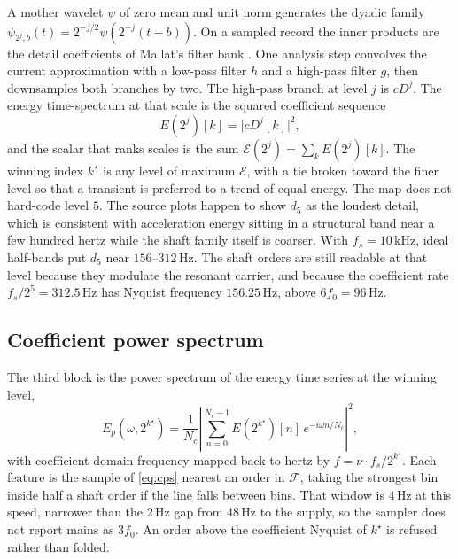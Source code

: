 \documentclass[11pt,a4paper]{article}
\begin{document}
A mother wavelet $\psi$ of zero mean and unit norm generates the dyadic family $\psi_{2^j,b}(t)=2^{-j/2}\psi(2^{-j}(t-b))$.
On a sampled record the inner products are the detail coefficients of Mallat's filter bank \cite{mallat1989,daubechies1988}.
One analysis step convolves the current approximation with a low-pass filter $h$ and a high-pass filter $g$, then downsamples both branches by two.
The high-pass branch at level $j$ is $cD^{j}$.
The energy time-spectrum at that scale is the squared coefficient sequence
\begin{equation}
E(2^{j})[k]=\lvert cD^{j}[k]\rvert^{2},
\label{eq:E}
\end{equation}
and the scalar that ranks scales is the sum $\mathcal{E}(2^{j})=\sum_k E(2^{j})[k]$.
The winning index $k^{\star}$ is any level of maximum $\mathcal{E}$, with a tie broken toward the finer level so that a transient is preferred to a trend of equal energy.
The map does not hard-code level $5$.
The source plots happen to show $d_5$ as the loudest detail, which is consistent with acceleration energy sitting in a structural band near a few hundred hertz while the shaft family itself is coarser.
With $f_s=10\,\mathrm{kHz}$, ideal half-bands put $d_5$ near $156$--$312\,\mathrm{Hz}$.
The shaft orders are still readable at that level because they modulate the resonant carrier, and because the coefficient rate $f_s/2^{5}=312.5\,\mathrm{Hz}$ has Nyquist frequency $156.25\,\mathrm{Hz}$, above $6f_0=96\,\mathrm{Hz}$.

\subsection{Coefficient power spectrum}

The third block is the power spectrum of the energy time series at the winning level,
\begin{equation}
E_{p}(\omega,2^{k^{\star}})
=\frac{1}{N_c}\left\lvert\sum_{n=0}^{N_c-1} E(2^{k^{\star}})[n]\,e^{-i\omega n/N_c}\right\rvert^{2},
\label{eq:cps}
\end{equation}
with coefficient-domain frequency mapped back to hertz by $f=\nu\cdot f_s/2^{k^{\star}}$.
Each feature is the sample of \eqref{eq:cps} nearest an order in $\mathcal{F}$, taking the strongest bin inside half a shaft order if the line falls between bins.
That window is $4\,\mathrm{Hz}$ at this speed, narrower than the $2\,\mathrm{Hz}$ gap from $48\,\mathrm{Hz}$ to the supply, so the sampler does not report mains as $3f_0$.
An order above the coefficient Nyquist of $k^{\star}$ is refused rather than folded.
\end{document}
